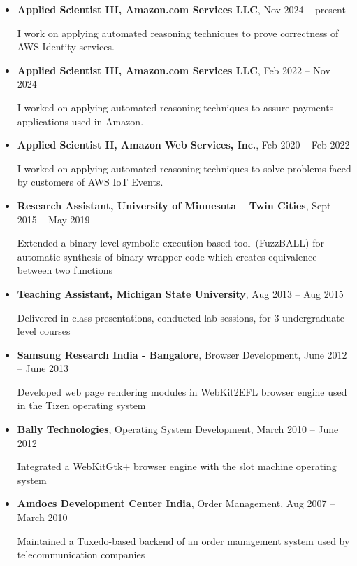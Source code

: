 \documentclass[letterpaper,10pt]{article}
\begin{document}
\begin{itemize}
  \item
    \textbf{Applied Scientist III, Amazon.com Services LLC}, Nov 2024 -- present 

    I work on applying automated reasoning techniques to prove correctness of AWS Identity services.
  
  \item
    \textbf{Applied Scientist III, Amazon.com Services LLC}, Feb 2022 -- Nov 2024

    I worked on applying automated reasoning techniques to assure
    payments applications used in Amazon.

  \item
    \textbf{Applied Scientist II, Amazon Web Services, Inc.}, Feb 2020 -- Feb 2022

    I worked on applying automated reasoning techniques to solve
    problems faced by customers of AWS IoT Events. 
\item 
\textbf{Research Assistant, University of Minnesota -- Twin Cities}, Sept 2015 -- May 2019 

Extended a binary-level symbolic execution-based tool~(FuzzBALL) for automatic synthesis of binary wrapper code which creates equivalence between two functions 
%
\item
\textbf{Teaching Assistant, Michigan State University}, Aug 2013 -- Aug 2015

Delivered in-class presentations, conducted lab sessions, for 3 undergraduate-level courses%

\item
\textbf{Samsung Research India - Bangalore}, Browser Development, June 2012 -- June 2013

Developed web page rendering modules in WebKit2EFL browser engine used in the Tizen operating system

\item
\textbf{Bally Technologies}, Operating System Development, March 2010 -- June 2012

Integrated a WebKitGtk+ browser engine with the slot machine operating system


\item
\textbf{Amdocs Development Center India}, Order Management, Aug 2007 -- March 2010

Maintained a Tuxedo-based backend of an order management system used by telecommunication companies


\end{itemize}
\end{document}
